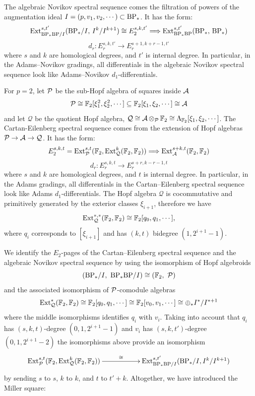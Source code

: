 The algebraic Novikov spectral sequence comes the filtration of powers of the augmentation ideal $I = (p, v_1, v_2, \cdots) \subset \BP_*$. It has the form:
$$ \Ext_{\BP_*\BP/I}^{s,t'}(\BP_*/I,\, I^k/I^{k+1}) \cong E_2^{s,k, t'} \Longrightarrow \Ext_{\BP_*\BP}^{s,t'}(\BP_*,\, \BP_*)$$
$$d_r: E_r^{s,k,t'} \longrightarrow E_r^{s+1,k+r-1,t'}$$
where $s$ and $k$ are homological degrees, and $t'$ is internal degree. In particular, in the Adams--Novikov gradings, all differentials in the algebraic Novikov spectral sequence look like Adams--Novikov $d_1$-differentials.

For $p=2$, let $\P$ be the sub-Hopf algebra of squares inside $\A$
\[ \P \cong \F_2[\xi_1^2, \xi_2^2, \cdots] \subseteq \F_2[\xi_1, \xi_2, \cdots] \cong \A \]
and let $\mathcal{Q}$ be the quotient Hopf algebra,
$\mathcal{Q} \cong \A \otimes_{\P} \F_2 \cong \Lambda_{\F_2}[\xi_1, \xi_2, \cdots]$.
The Cartan-Eilenberg spectral sequence comes from the extension of Hopf algebras
$\P \to \A \to \mathcal{Q}$.
It has the form:
$$E_2^{s,k,t} = \Ext^{s,t}_{\P}(\F_2, \Ext_{\mathcal{Q}}^k(\F_2, \F_2)) \Longrightarrow \Ext_{\A}^{s+k, t}(\F_2, \F_2)$$
$$d_r: E_r^{s,k,t} \longrightarrow E_r^{s+r,k-r-1,t}$$
where $s$ and $k$ are homological degrees, and $t$ is internal degree. In particular, in the Adams gradings, all differentials in the Cartan--Eilenberg spectral sequence look like Adams $d_1$-differentials.
The Hopf algebra $\mathcal{Q}$ is cocommutative and primitively generated by the exterior classes $\xi_{i+1}$, therefore we have
$$\Ext_{\mathcal{Q}}^{*,*}(\F_2, \F_2) \cong \F_2[q_0, q_1, \cdots],$$
where $q_i$ corresponds to $[\xi_{i+1}]$ and has $(k,t)$ bidegree $(1, 2^{i+1}-1)$.

We identify the $E_2$-pages of the Cartan--Eilenberg spectral sequence and the algebraic Novikov spectral sequence by using the isomorphism of Hopf algebroids
\[ (\BP_*/I,\ \BP_*\BP/I) \cong (\F_2,\ \P) \]
and the associated isomorphism of $\P$-comodule algebras
\[ \Ext_{\mathcal{Q}}^*(\F_2, \F_2) \cong \F_2[q_0, q_1, \cdots] \cong \F_2[v_0, v_1, \cdots] \cong \oplus_* I^*/I^{*+1} \]
where the middle isomorphisms identifies $q_i$ with $v_i$.
Taking into account that $q_i$ has $(s,k,t)$-degree $(0,1,2^{i+1} - 1)$ and $v_i$ has $(s,k,t')$-degree $(0,1,2^{i+1} - 2)$ the isomorphisms above provide an isomorphism
$$\xymatrix{
\Ext^{s,t}_{\P}(\F_2, \Ext_{\mathcal{Q}}^k(\F_2, \F_2)) \ar[rr]^-{\cong} & & \Ext_{\BP_*\BP/I}^{s,t'}(\BP_*/I, I^k/I^{k+1})
}$$
by sending $s$ to $s$, $k$ to $k$, and $t$ to $t'+k$.
Altogether, we have introduced the Miller square:

